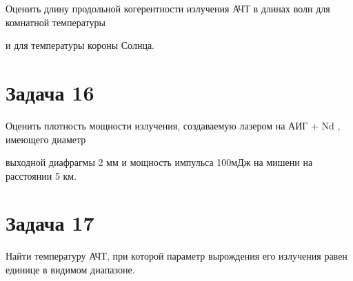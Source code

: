 \documentclass[14pt,a4paper]{article}
\begin{document}
    \par \textsf{Оценить длину продольной когерентности излучения АЧТ в
длинах волн для комнатной температуры}\\
    \par \textsf{и для температуры короны Солнца.}\\
    
    \par 

\section*{Задача 16}
    
    \par \textsf{Оценить плотность мощности излучения, создаваемую
лазером на АИГ + Nd , имеющего диаметр}\\
    \par \textsf{выходной диафрагмы 2 мм и мощность импульса 100мДж на мишени на расстоянии 5 км.}\\
    
    \par 

\section*{Задача 17}
    
    \par \textsf{Найти температуру АЧТ, при которой параметр вырождения его излучения равен единице в видимом диапазоне.}\\
    
    \par 
\end{document}
